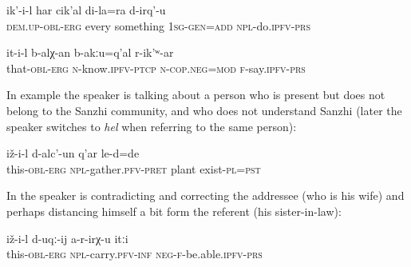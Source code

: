 \begin{exe}
		\label{In Urkarakh there is this son of my friend}
	\sn
	\gll	ik'-i-l	har	cik'al	di-la=ra	d-irq'-u\\
		\textsc{dem.up-obl}-\textsc{erg} 	every	something	\textsc{1sg}-\textsc{gen}=\textsc{add}	\textsc{npl}-do.\textsc{ipfv}-\textsc{prs}\\
	\glt	{}

	\ex	\label{She does not know anything, (my daughter) says.2}
	\gll	it-i-l	b-alχ-an	b-akːu=q'al	r-ik'ʷ-ar\\
		that-\textsc{obl}-\textsc{erg}	\textsc{n}-know.\textsc{ipfv}-\textsc{ptcp}	\textsc{n}-\textsc{cop.neg}=\textsc{mod}	\textsc{f}-say.\textsc{ipfv-prs}\\
	\glt	{}
\end{exe}

In example  the speaker is talking about a person who is present but does not belong to the Sanzhi community, and who does not understand Sanzhi (later the speaker switches to \textit{hel} when referring to the same person):

\begin{exe}
	\ex	\label{There were plants that she gathered.}
	\gll	iž-i-l	d-alc'-un	q'ar	le-d=de\\
		this-\textsc{obl}-\textsc{erg}	\textsc{npl}-gather.\textsc{pfv}-\textsc{pret}	plant	exist-\textsc{pl}=\textsc{pst}\\
	\glt	{}
\end{exe}

In  the speaker is contradicting and correcting the addressee (who is his wife) and perhaps distancing himself a bit form the referent (his sister-in-law):

\begin{exe}
	\label{Prepare (the groceries), when your little sister comes,}
	\sn
	\gll	iž-i-l	d-uqː-ij	a-r-irχ-u	itːi\\
		this-\textsc{obl}-\textsc{erg}	\textsc{npl}-carry.\textsc{pfv}-\textsc{inf}	\textsc{neg}-\textsc{f}-be.able.\textsc{ipfv}-\textsc{prs} \\
	\glt	{}
\end{exe}

